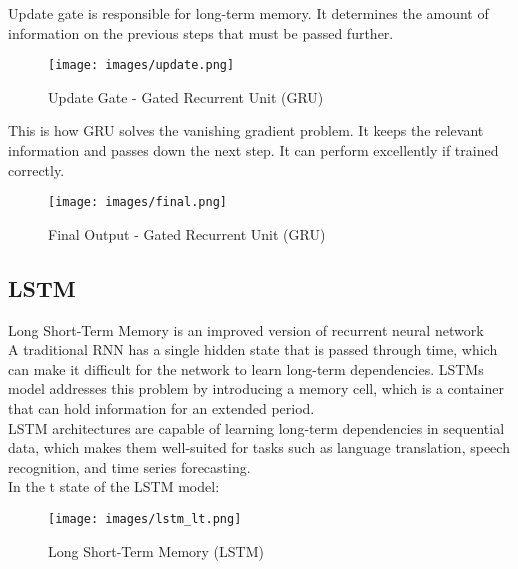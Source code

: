 \documentclass{ieeeojies}
\begin{document}
\indent Update gate is responsible for long-term memory. It determines the amount of information on the previous steps that must be passed further.

\begin{figure}[H]
  \centering
  \begin{minipage}{0.8\linewidth}
    \centering
    \texttt{[image: images/update.png]}
    \caption{Update Gate - Gated Recurrent Unit (GRU)}
    \label{fig8}
  \end{minipage}
\end{figure}

\indent This is how GRU solves the vanishing gradient problem. It keeps the relevant information and passes down the next step. It can perform excellently if trained correctly.

\begin{figure}[H]
  \centering
  \begin{minipage}{0.8\linewidth}
    \centering
    \texttt{[image: images/final.png]}
    \caption{Final Output - Gated Recurrent Unit (GRU)}
    \label{fig8}
  \end{minipage}
\end{figure}

\subsection{LSTM}
\indent Long Short-Term Memory is an improved version of recurrent neural network\\
\indent A traditional RNN has a single hidden state that is passed through time, which can make it difficult for the network to learn long-term dependencies. LSTMs model addresses this problem by introducing a memory cell, which is a container that can hold information for an extended period.\\
\indent LSTM architectures are capable of learning long-term dependencies in sequential data, which makes them well-suited for tasks such as language translation, speech recognition, and time series forecasting.\\
\indent In the t state of the LSTM model:
\begin{figure}[H]
  \centering
  \begin{minipage}{0.8\linewidth}
    \centering
    \texttt{[image: images/lstm\_lt.png]}
    \caption{Long Short-Term Memory (LSTM)}
    \label{fig8}
  \end{minipage}
\end{figure}
\end{document}
